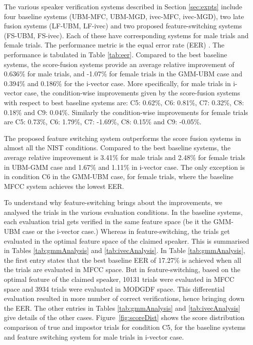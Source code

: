 \documentclass[preprint,12pt,5p]{elsarticle}
\begin{document}
The various speaker verification systems described in Section \ref{sec:expts} 
include four baseline systems (UBM-MFC, UBM-MGD, ivec-MFC, ivec-MGD), 
two late fusion systems (LF-UBM, LF-ivec) 
and two proposed feature-switching systems (FS-UBM, FS-ivec). Each of these have 
corresponding systems for male trials and female trials. The performance metric 
is the equal error rate (EER) \cite{eer1}. The performance is tabulated in Table \ref{tab:eer}.
Compared to the best baseline systems, the score-fusion systems provide an average
relative improvement of 0.636\% for male trials, and -1.07\% for female trials in the
GMM-UBM case and 0.394\% and 0.186\% for the i-vector case. More specifically, 
for male trials in i-vector case, the condition-wise improvements given by the score-fusion 
systems  with respect to best baseline systems are: C5: 0.62\%, C6: 0.81\%, C7: 0.32\%, 
C8: 0.18\% and C9: 0.04\%. Similarly the condition-wise improvements for
female trials are C5: 0.73\%, C6: 1.79\%, C7: -1.69\%, C8: 0.15\% and C9: -0.05\%.

The proposed feature switching system outperforms the score fusion systems in
almost all the NIST conditions. Compared to the best baseline systems, the average relative
improvement is 3.41\% for male trials and 2.48\% for female trials in UBM-GMM case and 
1.67\% and 1.11\% in i-vector case. The only exception is in condition C6 
in the GMM-UBM case, for female trials, where the baseline
MFCC system achieves the lowest EER.

To understand why feature-switching brings about the improvements, we
analysed the trials in the various evaluation conditions. In the baseline
systems, each evaluation trial gets verified in the same feature space (be it
the GMM-UBM case or the i-vector case.) Whereas in feature-switching, the trials
get evaluated in the optimal feature space of the claimed speaker. This is
summarised in Tables \ref{tab:gmmAnalysis} and \ref{tab:ivecAnalysis}.  In Table
\ref{tab:gmmAnalysis}, the first entry states that the best baseline EER of
17.27\% is achieved when all the trials are evaluated in MFCC space. But in
feature-switching, based on the optimal feature of the claimed speaker, 10131
trials were evaluated in MFCC space and 3934 trials were evaluated in MODGDF
space. This differential evaluation resulted in more number of correct
verifications, hence bringing down the EER. The other entries in Tables
\ref{tab:gmmAnalysis} and \ref{tab:ivecAnalysis} give details of the other
cases. Figure~\ref{fig:scoreDist} shows the score distribution comparison of true and 
impostor trials for condition C5, for the baseline systems and feature switching system 
for male trials in i-vector case.
\end{document}
